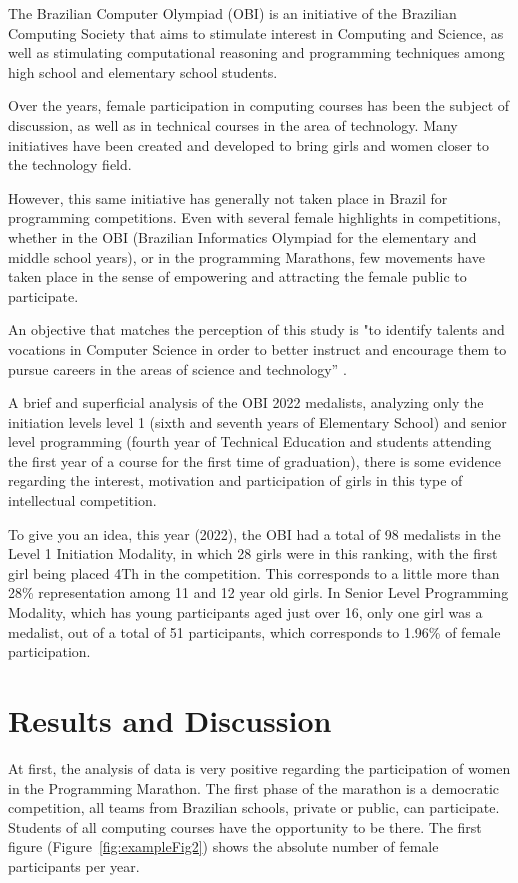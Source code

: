 \documentclass[12pt]{article}
\begin{document}
The Brazilian Computer Olympiad (OBI) is an initiative of the Brazilian Computing Society that aims to stimulate interest in Computing and Science, as well as stimulating computational reasoning and programming techniques among high school and elementary school students.

Over the years, female participation in computing courses has been the subject of discussion, as well as in technical courses in the area of technology. Many initiatives have been created and developed to bring girls and women closer to the technology field. 

However, this same initiative has generally not taken place in Brazil for programming competitions. Even with several female highlights in competitions, whether in the OBI (Brazilian Informatics Olympiad for the elementary and middle school years), or in the programming Marathons, few movements have taken place in the sense of empowering and attracting the female public to participate.

An objective that matches the perception of this study is "to identify talents and vocations in Computer Science in order to better instruct and encourage them to pursue careers in the areas of science and technology” \cite{OBI:22}.

A brief and superficial analysis of the OBI 2022 medalists, analyzing only the initiation levels level 1 (sixth and seventh years of Elementary School) and senior level programming (fourth year of Technical Education and students attending the first year of a course for the first time of graduation), there is some evidence regarding the interest, motivation and participation of girls in this type of intellectual competition.

To give you an idea, this year (2022), the OBI had a total of 98 medalists in the Level 1 Initiation Modality, in which 28 girls were in this ranking, with the first girl being placed 4Th in the competition. This corresponds to a little more than 28\% representation among 11 and 12 year old girls. 
In Senior Level Programming Modality, which has young participants aged just over 16, only one girl was a medalist, out of a total of 51 participants, which corresponds to 1.96\% of female participation.

\section{Results and Discussion}\label{sec:figs}

At first, the analysis of  data is very positive regarding the participation of women in the Programming Marathon. The first phase of the marathon is a democratic competition, all teams from Brazilian schools, private or public, can participate. Students of all computing courses have the opportunity to be there.
The first figure (Figure~\ref{fig:exampleFig2}) shows the absolute number of female participants per year.
\end{document}
